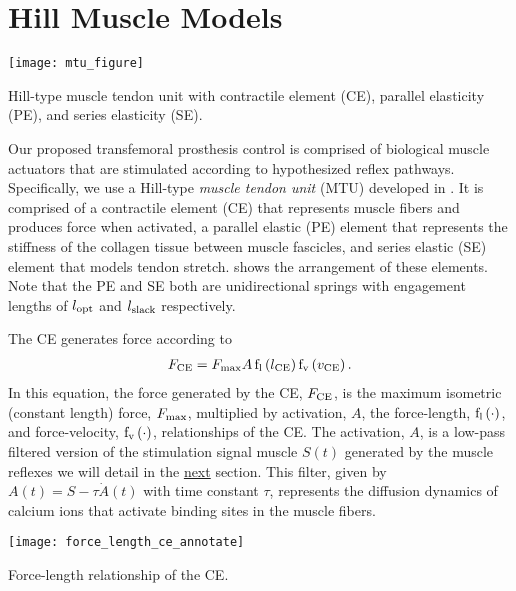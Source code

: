 \section{Hill Muscle Models}\label{sec:neuro_hill_muscle}
\begin{marginfigure}[-0.25in]
    \centering
    \texttt{[image: mtu\_figure]}
    \vspace{-0.4in}
    \caption{Hill-type muscle tendon unit with contractile element (CE),
    parallel elasticity (PE), and series elasticity (SE).}
    \label{fig:hill_type_mtu}
\end{marginfigure}
Our proposed transfemoral prosthesis control is comprised of biological muscle
actuators that are stimulated according to hypothesized reflex pathways.
Specifically, we use a Hill-type \emph{muscle tendon unit} (MTU) developed in
\citet{geyer2010muscle}. It is comprised of a contractile element (CE) that
represents muscle fibers and produces force when activated, a parallel elastic
(PE) element that represents the stiffness of the collagen tissue between muscle
fascicles, and series elastic (SE) element that models tendon stretch.
 shows the arrangement of these elements. Note that the
PE and SE both are unidirectional springs with engagement lengths of
$l_{\mathrm{opt}}$ and $l_{\mathrm{slack}}$ respectively.

The CE generates force according to
\begin{align}
    F_\tn{CE} = F_\tn{max} A \func{f_l}{l_\tn{CE}} \func{f_v}{v_\tn{CE}}.
    \label{eq:hill_ce}
\end{align}
In this equation, the force generated by the CE, $F_{\mathrm{CE}}$, is the maximum
isometric (constant length) force, $F_{\mathrm{max}}$, multiplied by activation, $A$,
the force-length, $\func{f_l}{\cdot}$, and force-velocity, $\func{f_v}{\cdot}$,
relationships of the CE\@. The activation, $A$, is a low-pass filtered version
of the stimulation signal muscle $S(t)$ generated by the muscle reflexes we will
detail in the \hyperref[sec:neuro_stance_reflexes]{next} section. This filter,
given by $A(t) = S - \tau \dot A(t)$ with time constant $\tau$, represents the
diffusion dynamics of calcium ions that activate binding sites in the muscle
fibers.
\begin{marginfigure}[-1in]
    \centering
    \texttt{[image: force\_length\_ce\_annotate]}
    \vspace{-0.25in}
    \caption{Force-length relationship of the CE.}
    \label{fig:force_length_ce}
\end{marginfigure}

